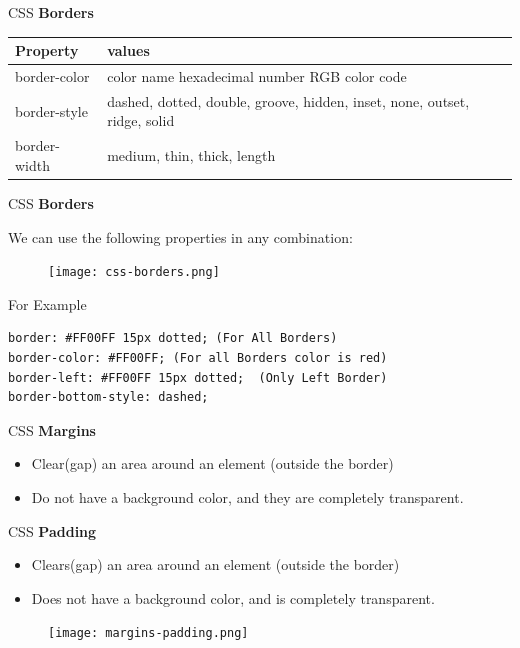 \documentclass[14pt]{beamer}
\begin{document}
\begin{frame}{CSS}
\textbf{Borders}

\vspace{1pc}
\begin{tabular}{|p{3.5cm} | p{6cm} |}
\hline
\textbf{Property} & \textbf{values}\\ \hline
border-color & color name hexadecimal number RGB color code\\ \hline
border-style & dashed, dotted, double, groove, hidden, inset, none, outset, ridge, solid \\ \hline
border-width &  medium, thin, thick, length  \\ \hline
\end{tabular}
\end{frame}

\begin{frame}[fragile]{CSS}
\textbf{Borders}

\small
\vspace{.5pc}
We can use the following properties in any combination:
\begin{figure}[H]
\centering
\texttt{[image: css-borders.png]}
\end{figure}
\begin{block}{For Example}
\begin{lstlisting}
border: #FF00FF 15px dotted; (For All Borders)
border-color: #FF00FF; (For all Borders color is red)
border-left: #FF00FF 15px dotted;  (Only Left Border)
border-bottom-style: dashed;
\end{lstlisting}
\end{block}
\end{frame}

\begin{frame}{CSS}
\textbf{Margins}

\begin{itemize}
 \item Clear(gap) an area around an element (outside the border)
 \item Do not have a background color, and they are completely transparent.
\end{itemize}
\end{frame}

\begin{frame}{CSS}
\textbf{Padding}
\begin{itemize}
 \item Clears(gap) an area around an element (outside the border)
 \item Does not have a background color, and is completely transparent.
\end{itemize}
\begin{figure}[H]
 \centering
 \texttt{[image: margins-padding.png]}
\end{figure}
\end{frame}
\end{document}
